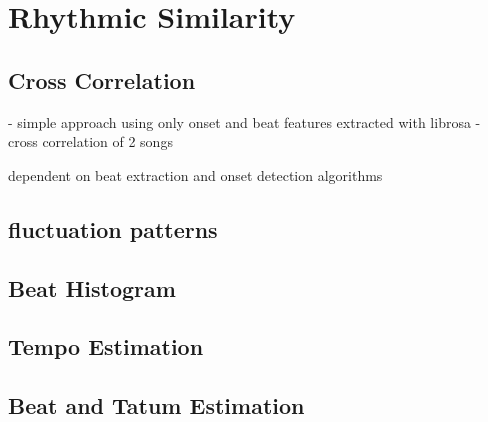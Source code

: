 \chapter{Rhythmic Similarity}\label{rhythmsimc}

\section{Cross Correlation}

- simple approach using only onset and beat features extracted with librosa
- cross correlation of 2 songs

dependent on beat extraction and onset detection algorithms

\section{fluctuation patterns}

\section{Beat Histogram}

\section{Tempo Estimation}

\section{Beat and Tatum Estimation}

